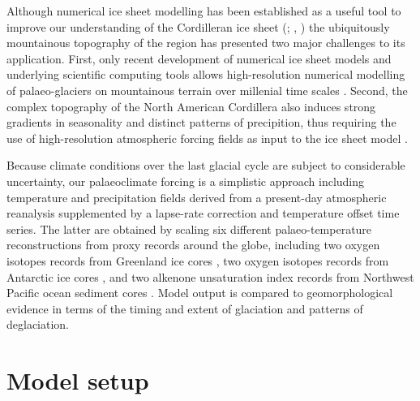 \documentclass[tc, manuscript]{copernicus}
\begin{document}
Although numerical ice sheet modelling has been established as a useful tool to
improve our understanding of the Cordilleran ice sheet
    (\citealp[p.~227]{Jackson.Clague.1991}; \citealp{Robert.1991},
     \citealp{Marshall.etal.2000})
the ubiquitously mountainous
topography of the region has presented two major challenges to its application.
First, only recent development of numerical ice sheet models and underlying
scientific computing tools \citep{Bueler.Brown.2009, Balay.etal.2014} allows
high-resolution numerical modelling of palaeo-glaciers on mountainous terrain
over millenial time scales \citep[e.g.,][]{Golledge.etal.2012}. Second, the
complex
topography of the North American Cordillera also induces strong gradients in
seasonality and distinct patterns of precipition, thus requiring the use of
high-resolution atmospheric forcing fields as input to the ice sheet model
\citep{Seguinot.etal.2014}.

Because climate conditions over the last glacial cycle are subject to
considerable uncertainty, our palaeoclimate forcing is a simplistic approach
including temperature and precipitation fields derived from a
present-day atmospheric reanalysis \citep{Mesinger.etal.2006,
Seguinot.etal.2014} supplemented by a lapse-rate correction
and temperature offset time series. The latter are obtained by scaling six
different palaeo-temperature reconstructions from proxy records around the
globe, including two oxygen isotopes records from Greenland ice cores
\citep{Dansgaard.etal.1993, Andersen.etal.2004}, two oxygen isotopes
records from Antarctic ice cores \citep{Petit.etal.1999,Jouzel.etal.2007},
and two alkenone unsaturation index records from Northwest Pacific ocean
sediment cores \citep{Herbert.etal.2001}. Model output is compared to
geomorphological evidence in terms of the timing and extent of glaciation and
patterns of deglaciation.


\section{Model setup}
\label{sec:model}

\end{document}
